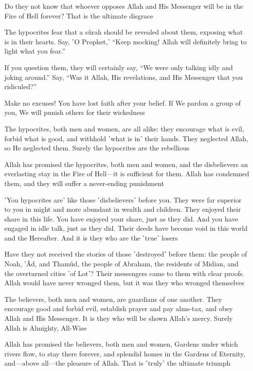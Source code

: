Do they not know that whoever opposes Allah and His Messenger will be in the Fire of Hell forever? That is the ultimate disgrace

The hypocrites fear that a sûrah should be revealed about them, exposing what is in their hearts. Say, ˹O Prophet,˺ “Keep mocking! Allah will definitely bring to light what you fear.”

If you question them, they will certainly say, “We were only talking idly and joking around.” Say, “Was it Allah, His revelations, and His Messenger that you ridiculed?”

Make no excuses! You have lost faith after your belief. If We pardon a group of you, We will punish others for their wickedness

The hypocrites, both men and women, are all alike: they encourage what is evil, forbid what is good, and withhold ˹what is in˺ their hands. They neglected Allah, so He neglected them. Surely the hypocrites are the rebellious

Allah has promised the hypocrites, both men and women, and the disbelievers an everlasting stay in the Fire of Hell—it is sufficient for them. Allah has condemned them, and they will suffer a never-ending punishment

˹You hypocrites are˺ like those ˹disbelievers˺ before you. They were far superior to you in might and more abundant in wealth and children. They enjoyed their share in this life. You have enjoyed your share, just as they did. And you have engaged in idle talk, just as they did. Their deeds have become void in this world and the Hereafter. And it is they who are the ˹true˺ losers

Have they not received the stories of those ˹destroyed˺ before them: the people of Noah, ’Âd, and Thamûd, the people of Abraham, the residents of Midian, and the overturned cities ˹of Lot˺? Their messengers came to them with clear proofs. Allah would have never wronged them, but it was they who wronged themselves

The believers, both men and women, are guardians of one another. They encourage good and forbid evil, establish prayer and pay alms-tax, and obey Allah and His Messenger. It is they who will be shown Allah’s mercy. Surely Allah is Almighty, All-Wise

Allah has promised the believers, both men and women, Gardens under which rivers flow, to stay there forever, and splendid homes in the Gardens of Eternity, and—above all—the pleasure of Allah. That is ˹truly˺ the ultimate triumph

